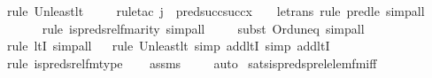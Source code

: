 \begin{isabellebody}
{\isacharparenleft}{\kern0pt}rule\ Un{\isacharunderscore}{\kern0pt}least{\isacharunderscore}{\kern0pt}lt{\isacharparenright}{\kern0pt}\isanewline
\ \ \ \ \isamarkupfalse%
{\isacharparenleft}{\kern0pt}rule{\isacharunderscore}{\kern0pt}tac\ j\ {\isacharequal}{\kern0pt}\ {\isachardoublequoteopen}pred{\isacharparenleft}{\kern0pt}succ{\isacharparenleft}{\kern0pt}succ{\isacharparenleft}{\kern0pt}x{\isacharparenright}{\kern0pt}{\isacharparenright}{\kern0pt}\ {\isasymunion}\ {}{\isacharparenright}{\kern0pt}{\isachardoublequoteclose}\ \ le{\isacharunderscore}{\kern0pt}trans{\isacharcomma}{\kern0pt}\ rule\ pred{\isacharunderscore}{\kern0pt}le{\isacharprime}{\kern0pt}{\isacharcomma}{\kern0pt}\ simp{\isacharunderscore}{\kern0pt}all{\isacharparenright}{\kern0pt}\isanewline
\ \ \ \ \ \isamarkupfalse%
{\isacharparenleft}{\kern0pt}rule\ is{\isacharunderscore}{\kern0pt}preds{\isacharunderscore}{\kern0pt}rel{\isacharunderscore}{\kern0pt}fm{\isacharunderscore}{\kern0pt}arity{\isacharcomma}{\kern0pt}\ simp{\isacharunderscore}{\kern0pt}all{\isacharparenright}{\kern0pt}\isanewline
\ \ \ \ \isamarkupfalse%
{\isacharparenleft}{\kern0pt}subst\ Ord{\isacharunderscore}{\kern0pt}un{\isacharunderscore}{\kern0pt}eq{}{\isacharcomma}{\kern0pt}\ simp{\isacharunderscore}{\kern0pt}all{\isacharparenright}{\kern0pt}\isanewline
\ \ \ \ \isamarkupfalse%
{\isacharparenleft}{\kern0pt}rule\ ltI{\isacharcomma}{\kern0pt}\ simp{\isacharunderscore}{\kern0pt}all{\isacharparenright}{\kern0pt}\isanewline
\ \ \isamarkupfalse%
{\isacharparenleft}{\kern0pt}rule\ Un{\isacharunderscore}{\kern0pt}least{\isacharunderscore}{\kern0pt}lt{\isacharcomma}{\kern0pt}\ simp\ add{\isacharcolon}{\kern0pt}ltI{\isacharcomma}{\kern0pt}\ simp\ add{\isacharcolon}{\kern0pt}ltI{\isacharparenright}{\kern0pt}\isanewline
\ \ \isamarkupfalse%
{\isacharparenleft}{\kern0pt}rule\ is{\isacharunderscore}{\kern0pt}preds{\isacharunderscore}{\kern0pt}rel{\isacharunderscore}{\kern0pt}fm{\isacharunderscore}{\kern0pt}type{\isacharparenright}{\kern0pt}\isanewline
\ \ \isamarkupfalse%
\ assms\ \isanewline
\ \ \isamarkupfalse%
\ auto%
\endisatagproof
{\isafoldproof}%
%
\isadelimproof
\isanewline
%
\endisadelimproof
\isanewline
{}\isamarkupfalse%
\ sats{\isacharunderscore}{\kern0pt}is{\isacharunderscore}{\kern0pt}preds{\isacharunderscore}{\kern0pt}prel{\isacharunderscore}{\kern0pt}elem{\isacharunderscore}{\kern0pt}fm{\isacharunderscore}{\kern0pt}iff\ {\isacharcolon}{\kern0pt}\ \isanewline

\end{isabellebody}
